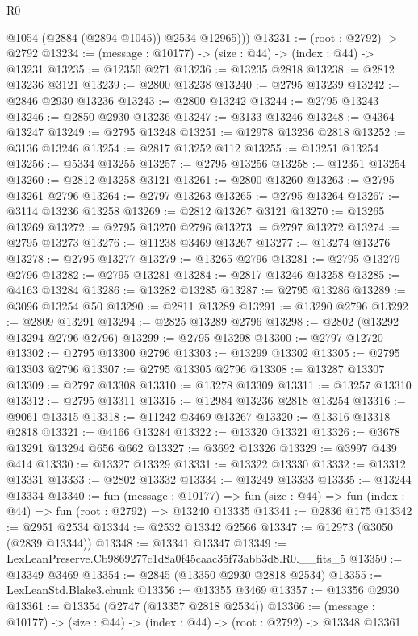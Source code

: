 \begin{lexlean}{R0}
\begin{coremodule}
          @1054
          (@2884 (@2894 @1045))
          @2534
          @12965)))
@13231 := (root : @2792) -> @2792
@13234 := (message : @10177) -> (size : @44) -> (index : @44) -> @13231
@13235 := @12350 @271
@13236 := @13235 @2818
@13238 := @2812 @13236 @3121
@13239 := @2800 @13238
@13240 := @2795 @13239
@13242 := @2846 @2930 @13236
@13243 := @2800 @13242
@13244 := @2795 @13243
@13246 := @2850 @2930 @13236
@13247 := @3133 @13246
@13248 := @4364 @13247
@13249 := @2795 @13248
@13251 := @12978 @13236 @2818
@13252 := @3136 @13246
@13254 := @2817 @13252 @112
@13255 := @13251 @13254
@13256 := @5334 @13255
@13257 := @2795 @13256
@13258 := @12351 @13254
@13260 := @2812 @13258 @3121
@13261 := @2800 @13260
@13263 := @2795 @13261 @2796
@13264 := @2797 @13263
@13265 := @2795 @13264
@13267 := @3114 @13236 @13258
@13269 := @2812 @13267 @3121
@13270 := @13265 @13269
@13272 := @2795 @13270 @2796
@13273 := @2797 @13272
@13274 := @2795 @13273
@13276 := @11238 @3469 @13267
@13277 := @13274 @13276
@13278 := @2795 @13277
@13279 := @13265 @2796
@13281 := @2795 @13279 @2796
@13282 := @2795 @13281
@13284 := @2817 @13246 @13258
@13285 := @4163 @13284
@13286 := @13282 @13285
@13287 := @2795 @13286
@13289 := @3096 @13254 @50
@13290 := @2811 @13289
@13291 := @13290 @2796
@13292 := @2809 @13291
@13294 := @2825 @13289 @2796
@13298 := @2802 (@13292 @13294 @2796 @2796)
@13299 := @2795 @13298
@13300 := @2797 @12720
@13302 := @2795 @13300 @2796
@13303 := @13299 @13302
@13305 := @2795 @13303 @2796
@13307 := @2795 @13305 @2796
@13308 := @13287 @13307
@13309 := @2797 @13308
@13310 := @13278 @13309
@13311 := @13257 @13310
@13312 := @2795 @13311
@13315 := @12984 @13236 @2818 @13254
@13316 := @9061 @13315
@13318 := @11242 @3469 @13267
@13320 := @13316 @13318 @2818
@13321 := @4166 @13284
@13322 := @13320 @13321
@13326 := @3678 @13291 @13294 @656 @662
@13327 := @3692 @13326
@13329 := @3997 @439 @414
@13330 := @13327 @13329
@13331 := @13322 @13330
@13332 := @13312 @13331
@13333 := @2802 @13332
@13334 := @13249 @13333
@13335 := @13244 @13334
@13340 := fun (message : @10177) =>
  fun (size : @44) => fun (index : @44) => fun (root : @2792) => @13240 @13335
@13341 := @2836 @175
@13342 := @2951 @2534
@13344 := @2532 @13342 @2566
@13347 := @12973 (@3050 (@2839 @13344))
@13348 := @13341 @13347
@13349 := LexLeanPreserve.Cb9869277c1d8a0f45caac35f73abb3d8.R0.__fits_5
@13350 := @13349 @3469
@13354 := @2845 (@13350 @2930 @2818 @2534)
@13355 := LexLeanStd.Blake3.chunk
@13356 := @13355 @3469
@13357 := @13356 @2930
@13361 := @13354 (@2747 (@13357 @2818 @2534))
@13366 := (message : @10177) -> (size : @44) -> (index : @44) -> (root : @2792) -> @13348 @13361

\end{coremodule}
\end{lexlean}
